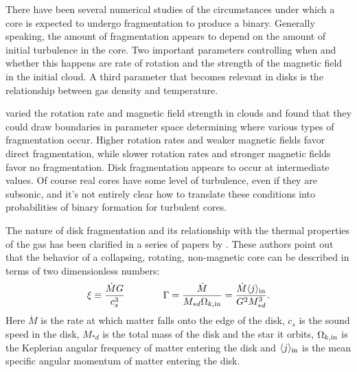 There have been several numerical studies of the circumstances under which a core is expected to undergo fragmentation to produce a binary. Generally speaking, the amount of fragmentation appears to depend on the amount of initial turbulence in the core. Two important parameters controlling when and whether this happens are rate of rotation and the strength of the magnetic field in the initial cloud. A third parameter that becomes relevant in disks is the relationship between gas density and temperature.

\citet{machida08b} varied the rotation rate and magnetic field strength in clouds and found that they could draw boundaries in parameter space determining where various types of fragmentation occur. Higher rotation rates and weaker magnetic fields favor direct fragmentation, while slower rotation rates and stronger magnetic fields favor no fragmentation. Disk fragmentation appears to occur at intermediate values. Of course real cores have some level of turbulence, even if they are subsonic, and it's not entirely clear how to translate these conditions into probabilities of binary formation for turbulent cores.

The nature of disk fragmentation and its relationship with the thermal properties of the gas has been clarified in a series of papers by \citet{kratter06a, kratter08a, kratter10a}. These authors point out that the behavior of a collapsing, rotating, non-magnetic core can be described in terms of two dimensionless numbers:
\begin{equation}
\xi \equiv \frac{\dot{M} G}{c_s^3} \qquad\qquad \Gamma = \frac{\dot{M}}{M_{*d}\Omega_{k,\rm in}} = \frac{\dot{M} \langle j\rangle_{\rm in}}{G^2 M_{*d}^3}.
\end{equation}
Here $\dot{M}$ is the rate at which matter falls onto the edge of the disk, $c_s$ is the sound speed in the disk, $M_{*d}$ is the total mass of the disk and the star it orbits, $\Omega_{k,\rm in}$ is the Keplerian angular frequency of matter entering the disk and $\langle j\rangle_{\rm in}$ is the mean specific angular momentum of matter entering the disk.

